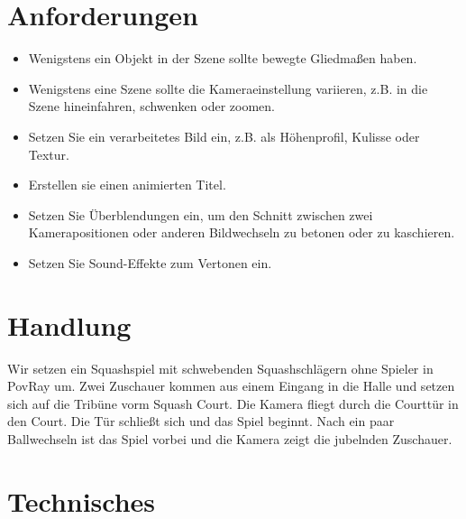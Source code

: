 \section{Anforderungen}
\begin{itemize}
	\item Wenigstens ein Objekt in der Szene sollte bewegte Gliedmaßen haben.
	\item Wenigstens eine Szene sollte die Kameraeinstellung variieren, z.B. in die Szene hineinfahren, schwenken oder zoomen.
	\item Setzen Sie ein verarbeitetes Bild ein, z.B. als Höhenprofil, Kulisse oder Textur.
	\item Erstellen sie einen animierten Titel.
	\item Setzen Sie Überblendungen ein, um den Schnitt zwischen zwei Kamerapositionen oder anderen Bildwechseln zu betonen oder zu kaschieren.
	\item Setzen Sie Sound-Effekte zum Vertonen ein.
\end{itemize}
%
\section{Handlung}
Wir setzen ein Squashspiel mit schwebenden Squashschlägern ohne Spieler in PovRay um. Zwei Zuschauer kommen aus einem Eingang in die Halle und setzen sich auf die Tribüne vorm Squash Court. Die Kamera fliegt durch die Courttür in den Court. Die Tür schließt sich und das Spiel beginnt. Nach ein paar Ballwechseln ist das Spiel vorbei und die Kamera zeigt die jubelnden Zuschauer. 
%
\section{Technisches}
